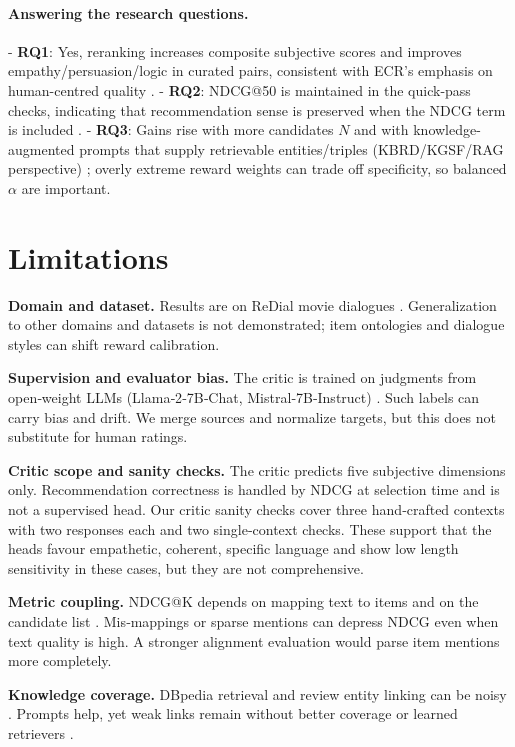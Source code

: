 \documentclass[12pt]{article}
\begin{document}
  \paragraph{Answering the research questions.}
  - \textbf{RQ1}: Yes, reranking increases composite subjective scores and improves empathy/persuasion/logic in curated pairs, consistent with ECR's emphasis on human-centred quality \citep{zhang2024ecr}.
  - \textbf{RQ2}: NDCG@50 is maintained in the quick-pass checks, indicating that recommendation sense is preserved when the NDCG term is included \citep{evidently_ndcg}.
  - \textbf{RQ3}: Gains rise with more candidates $N$ and with knowledge-augmented prompts that supply retrievable entities/triples (KBRD/KGSF/RAG perspective) \citep{chen2020kbrd,zhou2020kgsf,lewis2020rag}; overly extreme reward weights can trade off specificity, so balanced \(\alpha\) are important.
  
  \section{Limitations}
  \textbf{Domain and dataset.} Results are on ReDial movie dialogues \citep{charlin2018redial}. Generalization to other domains and datasets is not demonstrated; item ontologies and dialogue styles can shift reward calibration.
  
  \textbf{Supervision and evaluator bias.} The critic is trained on judgments from open‑weight LLMs (Llama‑2‑7B‑Chat, Mistral‑7B‑Instruct) \citep{meta2023llama2,mistral2023}. Such labels can carry bias and drift. We merge sources and normalize targets, but this does not substitute for human ratings.
  
  \textbf{Critic scope and sanity checks.} The critic predicts five subjective dimensions only. Recommendation correctness is handled by NDCG at selection time and is not a supervised head. Our critic sanity checks cover three hand‑crafted contexts with two responses each and two single‑context checks. These support that the heads favour empathetic, coherent, specific language and show low length sensitivity in these cases, but they are not comprehensive.
  
  \textbf{Metric coupling.} NDCG@K depends on mapping text to items and on the candidate list \citep{evidently_ndcg}. Mis‑mappings or sparse mentions can depress NDCG even when text quality is high. A stronger alignment evaluation would parse item mentions more completely.
  
  \textbf{Knowledge coverage.} DBpedia retrieval and review entity linking can be noisy \citep{dbpedia_wikipedia}. Prompts help, yet weak links remain without better coverage or learned retrievers \citep{lewis2020rag}.
  
\end{document}
